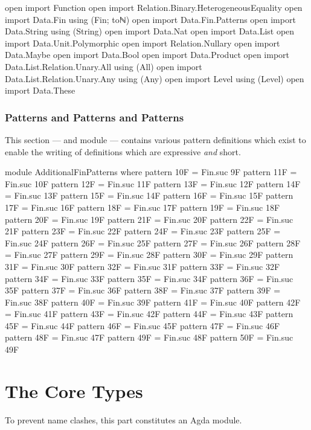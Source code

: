 \documentclass{report}
\begin{document}
\begin{code}
open import Function
open import Relation.Binary.HeterogeneousEquality
open import Data.Fin using (Fin; toℕ)
open import Data.Fin.Patterns
open import Data.String using (String)
open import Data.Nat
open import Data.List
open import Data.Unit.Polymorphic
open import Relation.Nullary
open import Data.Maybe
open import Data.Bool
open import Data.Product
open import Data.List.Relation.Unary.All using (All)
open import Data.List.Relation.Unary.Any using (Any)
open import Level using (Level)
open import Data.These
\end{code}

\section{Patterns and Patterns and Patterns}
This section --- and module --- contains various pattern definitions which exist to enable the writing of definitions which are expressive \emph{and} short.

\begin{code}
module AdditionalFinPatterns where
  pattern 10F = Fin.suc 9F
  pattern 11F = Fin.suc 10F
  pattern 12F = Fin.suc 11F
  pattern 13F = Fin.suc 12F
  pattern 14F = Fin.suc 13F
  pattern 15F = Fin.suc 14F
  pattern 16F = Fin.suc 15F
  pattern 17F = Fin.suc 16F
  pattern 18F = Fin.suc 17F
  pattern 19F = Fin.suc 18F
  pattern 20F = Fin.suc 19F
  pattern 21F = Fin.suc 20F
  pattern 22F = Fin.suc 21F
  pattern 23F = Fin.suc 22F
  pattern 24F = Fin.suc 23F
  pattern 25F = Fin.suc 24F
  pattern 26F = Fin.suc 25F
  pattern 27F = Fin.suc 26F
  pattern 28F = Fin.suc 27F
  pattern 29F = Fin.suc 28F
  pattern 30F = Fin.suc 29F
  pattern 31F = Fin.suc 30F
  pattern 32F = Fin.suc 31F
  pattern 33F = Fin.suc 32F
  pattern 34F = Fin.suc 33F
  pattern 35F = Fin.suc 34F
  pattern 36F = Fin.suc 35F
  pattern 37F = Fin.suc 36F
  pattern 38F = Fin.suc 37F
  pattern 39F = Fin.suc 38F
  pattern 40F = Fin.suc 39F
  pattern 41F = Fin.suc 40F
  pattern 42F = Fin.suc 41F
  pattern 43F = Fin.suc 42F
  pattern 44F = Fin.suc 43F
  pattern 45F = Fin.suc 44F
  pattern 46F = Fin.suc 45F
  pattern 47F = Fin.suc 46F
  pattern 48F = Fin.suc 47F
  pattern 49F = Fin.suc 48F
  pattern 50F = Fin.suc 49F
\end{code}

\part{The Core Types}
To prevent name clashes, this part constitutes an Agda module.
\end{document}
